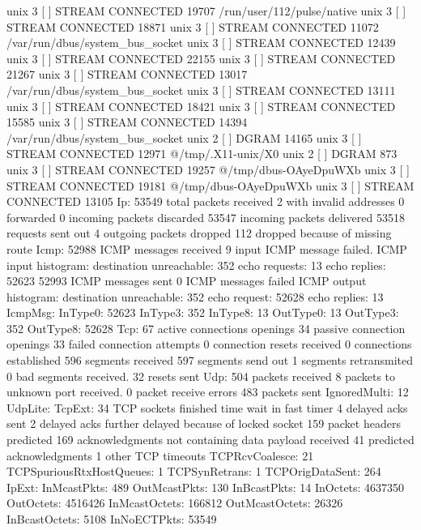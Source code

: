 unix  3      [ ]         STREAM     CONNECTED     19707    /run/user/112/pulse/native
unix  3      [ ]         STREAM     CONNECTED     18871    
unix  3      [ ]         STREAM     CONNECTED     11072    /var/run/dbus/system_bus_socket
unix  3      [ ]         STREAM     CONNECTED     12439    
unix  3      [ ]         STREAM     CONNECTED     22155    
unix  3      [ ]         STREAM     CONNECTED     21267    
unix  3      [ ]         STREAM     CONNECTED     13017    /var/run/dbus/system_bus_socket
unix  3      [ ]         STREAM     CONNECTED     13111    
unix  3      [ ]         STREAM     CONNECTED     18421    
unix  3      [ ]         STREAM     CONNECTED     15585    
unix  3      [ ]         STREAM     CONNECTED     14394    /var/run/dbus/system_bus_socket
unix  2      [ ]         DGRAM                    14165    
unix  3      [ ]         STREAM     CONNECTED     12971    @/tmp/.X11-unix/X0
unix  2      [ ]         DGRAM                    873      
unix  3      [ ]         STREAM     CONNECTED     19257    @/tmp/dbus-OAyeDpuWXb
unix  3      [ ]         STREAM     CONNECTED     19181    @/tmp/dbus-OAyeDpuWXb
unix  3      [ ]         STREAM     CONNECTED     13105    
Ip:
    53549 total packets received
    2 with invalid addresses
    0 forwarded
    0 incoming packets discarded
    53547 incoming packets delivered
    53518 requests sent out
    4 outgoing packets dropped
    112 dropped because of missing route
Icmp:
    52988 ICMP messages received
    9 input ICMP message failed.
    ICMP input histogram:
        destination unreachable: 352
        echo requests: 13
        echo replies: 52623
    52993 ICMP messages sent
    0 ICMP messages failed
    ICMP output histogram:
        destination unreachable: 352
        echo request: 52628
        echo replies: 13
IcmpMsg:
        InType0: 52623
        InType3: 352
        InType8: 13
        OutType0: 13
        OutType3: 352
        OutType8: 52628
Tcp:
    67 active connections openings
    34 passive connection openings
    33 failed connection attempts
    0 connection resets received
    0 connections established
    596 segments received
    597 segments send out
    1 segments retransmited
    0 bad segments received.
    32 resets sent
Udp:
    504 packets received
    8 packets to unknown port received.
    0 packet receive errors
    483 packets sent
    IgnoredMulti: 12
UdpLite:
TcpExt:
    34 TCP sockets finished time wait in fast timer
    4 delayed acks sent
    2 delayed acks further delayed because of locked socket
    159 packet headers predicted
    169 acknowledgments not containing data payload received
    41 predicted acknowledgments
    1 other TCP timeouts
    TCPRcvCoalesce: 21
    TCPSpuriousRtxHostQueues: 1
    TCPSynRetrans: 1
    TCPOrigDataSent: 264
IpExt:
    InMcastPkts: 489
    OutMcastPkts: 130
    InBcastPkts: 14
    InOctets: 4637350
    OutOctets: 4516426
    InMcastOctets: 166812
    OutMcastOctets: 26326
    InBcastOctets: 5108
    InNoECTPkts: 53549
